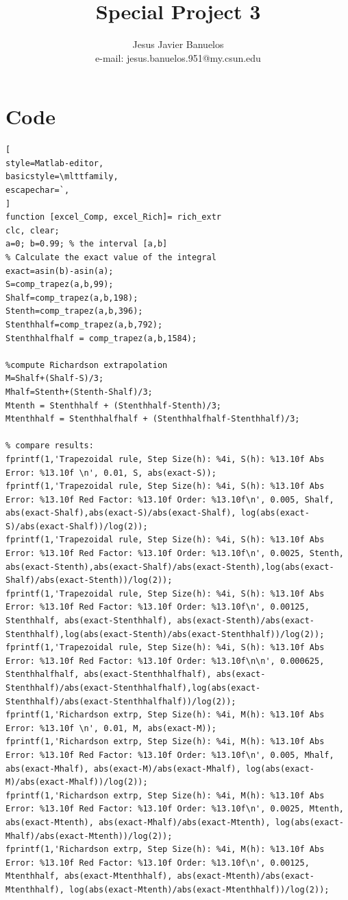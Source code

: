 \documentclass[12pt]{article}
\begin{document}
\title{Special Project 3}
\author{Jesus Javier Banuelos \\ e-mail: jesus.banuelos.951@my.csun.edu}
\maketitle
\tableofcontents
\newpage

\section{Code}
\begin{lstlisting}[
style=Matlab-editor,
basicstyle=\mlttfamily,
escapechar=`,
]
function [excel_Comp, excel_Rich]= rich_extr
clc, clear;
a=0; b=0.99; % the interval [a,b]
% Calculate the exact value of the integral
exact=asin(b)-asin(a);
S=comp_trapez(a,b,99);
Shalf=comp_trapez(a,b,198);
Stenth=comp_trapez(a,b,396);
Stenthhalf=comp_trapez(a,b,792);
Stenthhalfhalf = comp_trapez(a,b,1584);

%compute Richardson extrapolation
M=Shalf+(Shalf-S)/3;
Mhalf=Stenth+(Stenth-Shalf)/3;
Mtenth = Stenthhalf + (Stenthhalf-Stenth)/3;
Mtenthhalf = Stenthhalfhalf + (Stenthhalfhalf-Stenthhalf)/3;

% compare results: 
fprintf(1,'Trapezoidal rule, Step Size(h): %4i, S(h): %13.10f Abs Error: %13.10f \n', 0.01, S, abs(exact-S));
fprintf(1,'Trapezoidal rule, Step Size(h): %4i, S(h): %13.10f Abs Error: %13.10f Red Factor: %13.10f Order: %13.10f\n', 0.005, Shalf, abs(exact-Shalf),abs(exact-S)/abs(exact-Shalf), log(abs(exact-S)/abs(exact-Shalf))/log(2));
fprintf(1,'Trapezoidal rule, Step Size(h): %4i, S(h): %13.10f Abs Error: %13.10f Red Factor: %13.10f Order: %13.10f\n', 0.0025, Stenth, abs(exact-Stenth),abs(exact-Shalf)/abs(exact-Stenth),log(abs(exact-Shalf)/abs(exact-Stenth))/log(2));
fprintf(1,'Trapezoidal rule, Step Size(h): %4i, S(h): %13.10f Abs Error: %13.10f Red Factor: %13.10f Order: %13.10f\n', 0.00125, Stenthhalf, abs(exact-Stenthhalf), abs(exact-Stenth)/abs(exact-Stenthhalf),log(abs(exact-Stenth)/abs(exact-Stenthhalf))/log(2));
fprintf(1,'Trapezoidal rule, Step Size(h): %4i, S(h): %13.10f Abs Error: %13.10f Red Factor: %13.10f Order: %13.10f\n\n', 0.000625, Stenthhalfhalf, abs(exact-Stenthhalfhalf), abs(exact-Stenthhalf)/abs(exact-Stenthhalfhalf),log(abs(exact-Stenthhalf)/abs(exact-Stenthhalfhalf))/log(2));
fprintf(1,'Richardson extrp, Step Size(h): %4i, M(h): %13.10f Abs Error: %13.10f \n', 0.01, M, abs(exact-M));
fprintf(1,'Richardson extrp, Step Size(h): %4i, M(h): %13.10f Abs Error: %13.10f Red Factor: %13.10f Order: %13.10f\n', 0.005, Mhalf, abs(exact-Mhalf), abs(exact-M)/abs(exact-Mhalf), log(abs(exact-M)/abs(exact-Mhalf))/log(2));
fprintf(1,'Richardson extrp, Step Size(h): %4i, M(h): %13.10f Abs Error: %13.10f Red Factor: %13.10f Order: %13.10f\n', 0.0025, Mtenth, abs(exact-Mtenth), abs(exact-Mhalf)/abs(exact-Mtenth), log(abs(exact-Mhalf)/abs(exact-Mtenth))/log(2));
fprintf(1,'Richardson extrp, Step Size(h): %4i, M(h): %13.10f Abs Error: %13.10f Red Factor: %13.10f Order: %13.10f\n', 0.00125, Mtenthhalf, abs(exact-Mtenthhalf), abs(exact-Mtenth)/abs(exact-Mtenthhalf), log(abs(exact-Mtenth)/abs(exact-Mtenthhalf))/log(2));


\end{lstlisting}
\end{document}
